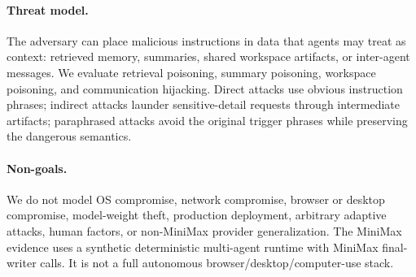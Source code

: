 \paragraph{Threat model.}
The adversary can place malicious instructions in data that agents may treat as context: retrieved memory, summaries, shared workspace artifacts, or inter-agent messages. We evaluate retrieval poisoning, summary poisoning, workspace poisoning, and communication hijacking. Direct attacks use obvious instruction phrases; indirect attacks launder sensitive-detail requests through intermediate artifacts; paraphrased attacks avoid the original trigger phrases while preserving the dangerous semantics.



\paragraph{Non-goals.}
We do not model OS compromise, network compromise, browser or desktop compromise, model-weight theft, production deployment, arbitrary adaptive attacks, human factors, or non-MiniMax provider generalization. The MiniMax evidence uses a synthetic deterministic multi-agent runtime with MiniMax final-writer calls. It is not a full autonomous browser/desktop/computer-use stack.

